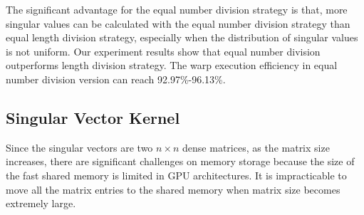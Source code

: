 The significant advantage for the equal number division strategy is that, more singular values can be calculated with the equal number division strategy than equal length division strategy, especially when the distribution of singular values is not uniform.
Our experiment results show that equal number division outperforms length division strategy.
The warp execution efficiency in equal number division version can reach 92.97\%-96.13\%.




\subsection{Singular Vector Kernel}
\label{sec_svector}
Since the singular vectors are
two $n\times n$ dense matrices, as the matrix size increases, there are
significant challenges on memory storage because the size of the fast shared memory is limited in GPU architectures.
It is impracticable to move all the matrix entries to the shared memory when matrix size becomes extremely large.

